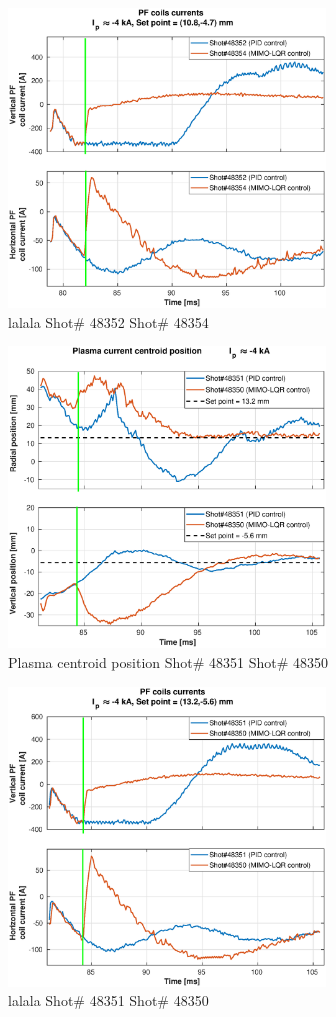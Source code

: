 \begin{figure}
	\centering
	\includegraphics[width=0.75\textwidth]{Chp5/PIDvsMIMO_352_354_curr_2.eps}
	\caption{lalala Shot\# 48352 Shot\# 48354}
\end{figure}


\begin{figure}
	\centering
	\includegraphics[width=0.75\textwidth]{Chp5/PIDvsMIMO_351_350_2.eps}
	\caption{Plasma centroid position Shot\# 48351 Shot\# 48350}
\end{figure}

\begin{figure}
	\centering
	\includegraphics[width=0.75\textwidth]{Chp5/PIDvsMIMO_351_350_curr_2.eps}
	\caption{lalala Shot\# 48351 Shot\# 48350}
\end{figure}